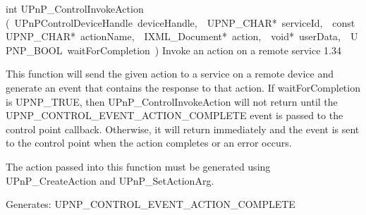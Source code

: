 \documentclass{article}
\begin{document}
\begin{cxxentry}
\begin{cxxfunction}
\begin{cxxdoc}
\end{cxxdoc}
\end{cxxfunction}
\begin{cxxfunction}
{int}
        {UPnP\_ControlInvokeAction}
        {(\ UPnPControlDeviceHandle\ deviceHandle,\ \ UPNP\_CHAR*\ serviceId,\ \ const\ UPNP\_CHAR*\ actionName,\ \ IXML\_Document*\ action,\ \ void*\ userData,\ \ UPNP\_BOOL\ waitForCompletion\ )}
        {Invoke an action on a remote service }
        {1.34}
\cxxSee{\strut}
\begin{cxxdoc}

This function will send the given action to a service on a remote
device and generate an event that contains the response to that action.
If waitForCompletion is UPNP\_TRUE, then UPnP\_ControlInvokeAction will
not return until the UPNP\_CONTROL\_EVENT\_ACTION\_COMPLETE event is
passed to the control point callback.  Otherwise, it will return
immediately and the event is sent to the control point when the
action completes or an error occurs.

The action passed into this function must be generated using
UPnP\_CreateAction and UPnP\_SetActionArg.

Generates:
UPNP\_CONTROL\_EVENT\_ACTION\_COMPLETE



\end{cxxdoc}
\end{cxxfunction}
\end{cxxentry}
\end{document}

